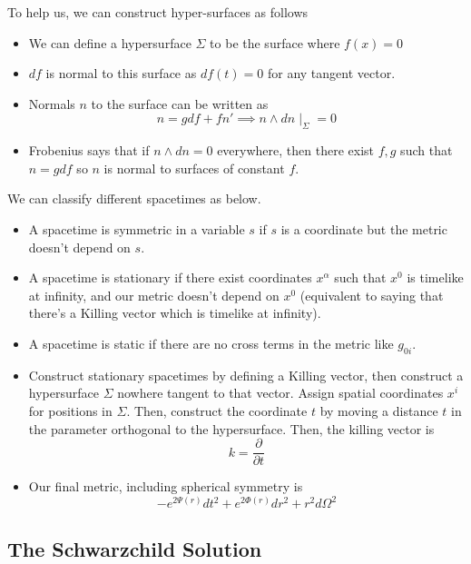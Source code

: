 \documentclass[11pt, oneside]{article}   	%
\theoremstyle{slanted}
\begin{document}
To help us, we can construct hyper-surfaces as follows 
\begin{itemize}
\item We can define a hypersurface $ \Sigma $ to be the surface where $ f ( x )  = 0$
\item $df $ is normal to this surface as $ df ( t ) = 0 $ for any tangent vector. 
\item Normals $ n $ to the surface can be written as 
\[
 n = g df + f n' \implies n \wedge  dn \mid_{ \Sigma }  =0 
\] 
\item Frobenius says that if $ n \wedge  dn  =0  $  everywhere, then 
there exist $ f, g $ such that $ n = g d f$ so $ n $ is 
normal to surfaces of constant $ f $. 


\end{itemize}
We can classify different spacetimes as below. 
\begin{itemize}
\item A spacetime is symmetric in a 
variable $ s $ if $ s $ is a coordinate
but the metric doesn't depend on $ s $. 
\item A spacetime is stationary if there exist coordinates $ x ^ \alpha $ 
such that $  x^ 0$ is timelike at infinity, and our metric 
doesn't depend on $ x^ 0 $ (equivalent to saying that there's a Killing vector
which is timelike at infinity). 
\item A spacetime is static if there are no cross terms in the metric like 
$ g _{ 0i } $. 
\item Construct stationary spacetimes by defining a Killing vector, 
then construct a hypersurface $ \Sigma $ nowhere tangent to 
that vector. Assign spatial coordinates $ x ^ i $ for positions in 
$ \Sigma $. Then, construct 
the coordinate $ t $ by moving a distance $ t $ in the parameter
orthogonal to the hypersurface. Then, the killing vector is 
\[
 k = \frac{\partial   }{\partial  t } 
\] 
\item Our final metric, including spherical symmetry is 
\[
	- e ^{  2 \Psi ( r ) } dt ^ 2 + e^{ 2 \Phi ( r ) } dr ^ 2 + r ^ 2 d \Omega ^ 2 
\] 
\end{itemize}

\subsection{The Schwarzchild Solution}
\end{document}
